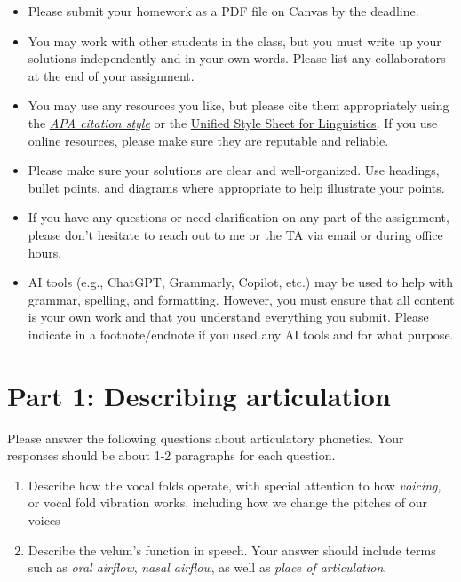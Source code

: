 \documentclass[12pt, letterpaper]{article}
\begin{document}
\begin{tcolorbox}[colback=LightGray!10!white,colframe=LightGray!75!black,title=Instructions]
    \begin{itemize}
        \item Please submit your homework as a PDF file on Canvas by the deadline.
        \item You may work with other students in the class, but you must write up your solutions independently and in your own words. Please list any collaborators at the end of your assignment.
        \item You may use any resources you like, but please cite them appropriately using the \href{https://apastyle.apa.org/}{\textit{APA citation style}} or the \href{https://langsci-press.org/unifiedstylesheet}{Unified Style Sheet for Linguistics}. If you use online resources, please make sure they are reputable and reliable.
        \item Please make sure your solutions are clear and well-organized. Use headings, bullet points, and diagrams where appropriate to help illustrate your points.
        \item If you have any questions or need clarification on any part of the assignment, please don't hesitate to reach out to me or the TA via email or during office hours.
        \item AI tools (e.g., ChatGPT, Grammarly, Copilot, etc.) may be used to help with grammar, spelling, and formatting. However, you must ensure that all content is your own work and that you understand everything you submit. Please indicate in a footnote/endnote if you used any AI tools and for what purpose.
    \end{itemize}
\end{tcolorbox}

\section*{Part 1: Describing articulation} \label{sec:describingarticulation}

Please answer the following questions about articulatory phonetics. Your responses should be about 1-2 paragraphs for each question. 

\begin{enumerate}
    \item Describe how the vocal folds operate, with special attention to how \textit{voicing}, or vocal fold vibration works, including how we change the pitches of our voices
    \item Describe the velum’s function in speech. Your answer should include terms such as \textit{oral airflow}, \textit{nasal airflow}, as well as \textit{place of articulation}.
\end{enumerate}
\end{document}
